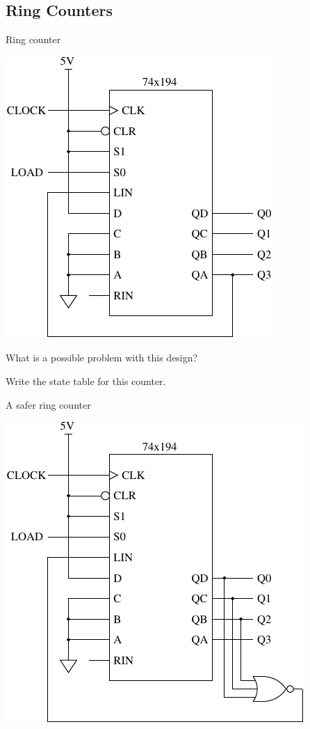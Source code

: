 \subsection{Ring Counters}

\begin{frame}{Ring counter}
  \begin{center}
    \includegraphics[scale=0.9]{74x194RingCounterSchematic}
  \end{center}
  What is a possible problem with this design?
\end{frame}

Write the state table for this counter.

\begin{frame}{A safer ring counter}
  \begin{center}
    \includegraphics[scale=0.9]{74x194RingCounterCorrectingSchematic}
  \end{center}
\end{frame}

